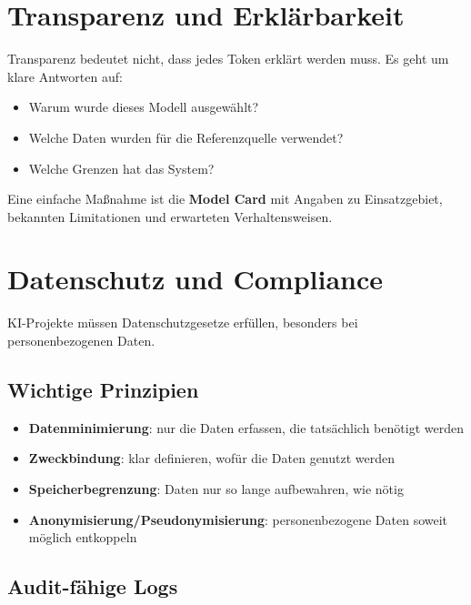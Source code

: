 \section{Transparenz und Erklärbarkeit}

Transparenz bedeutet nicht, dass jedes Token erklärt werden muss. Es geht um klare Antworten auf:

\begin{itemize}[leftmargin=*]
    \item Warum wurde dieses Modell ausgewählt?
    \item Welche Daten wurden für die Referenzquelle verwendet?
    \item Welche Grenzen hat das System?
\end{itemize}

Eine einfache Maßnahme ist die \textbf{Model Card} mit Angaben zu Einsatzgebiet, bekannten Limitationen und erwarteten Verhaltensweisen.

\section{Datenschutz und Compliance}

KI-Projekte müssen Datenschutzgesetze erfüllen, besonders bei personenbezogenen Daten.

\subsection{Wichtige Prinzipien}

\begin{itemize}[leftmargin=*]
    \item \textbf{Datenminimierung}: nur die Daten erfassen, die tatsächlich benötigt werden
    \item \textbf{Zweckbindung}: klar definieren, wofür die Daten genutzt werden
    \item \textbf{Speicherbegrenzung}: Daten nur so lange aufbewahren, wie nötig
    \item \textbf{Anonymisierung/Pseudonymisierung}: personenbezogene Daten soweit möglich entkoppeln
\end{itemize}

\subsection{Audit-fähige Logs}

